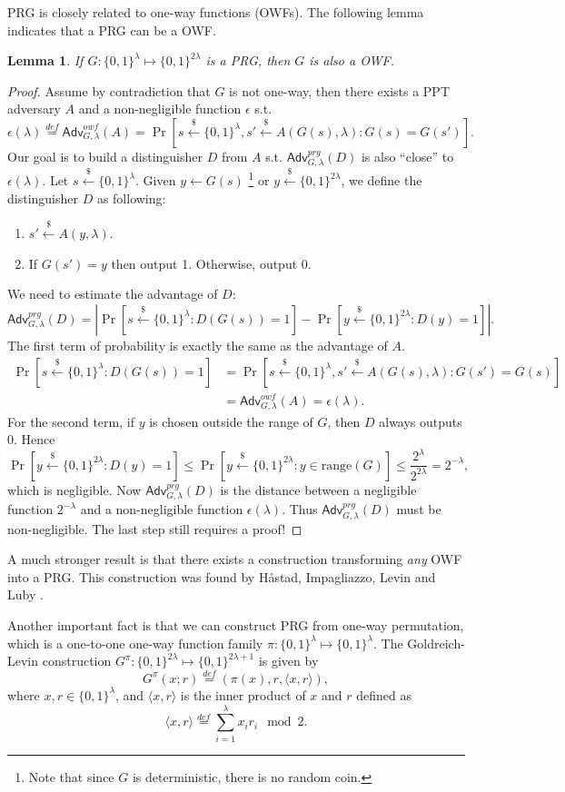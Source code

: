 \documentclass[12pt]{article}
\newcommand{\eqdef}{\stackrel{def}{=}}
\newcommand{\bits}{\{0,1\}}
\newcommand{\getsr}{\stackrel{\$}{\gets}}
\newcommand{\angles}[1]{\langle #1 \rangle}
\newcommand{\Adv}{\textsf{Adv}}
\newtheorem{lemma}[theorem]{Lemma}
\theoremstyle{definition}
\begin{document}
PRG is closely related to one-way functions (OWFs). The following lemma indicates that a PRG can be a OWF.
\begin{lemma}
If $G:\bits^\lambda \mapsto \bits^{2\lambda}$ is a PRG, then $G$ is also a OWF.
\end{lemma}
\begin{proof}
Assume by contradiction that $G$ is not one-way, then there exists a PPT adversary $A$ and a non-negligible function $\epsilon$ s.t.
$$\epsilon(\lambda) \eqdef \Adv_{G,\lambda}^{owf}(A) =\Pr[s\getsr\bits^\lambda, s'\getsr A(G(s),\lambda): G(s)=G(s')].$$
Our goal is to build a distinguisher $D$ from $A$ s.t. $\Adv_{G,\lambda}^{prg}(D)$ is also ``close'' to $\epsilon(\lambda)$.
Let $s\getsr\bits^\lambda$. Given $y\gets G(s)$ \footnote{Note that since $G$ is deterministic, there is no random coin.} or $y\getsr \bits^{2\lambda}$, we define the distinguisher $D$ as following:
\begin{enumerate}
\item $s' \getsr A(y, \lambda)$.
\item If $G(s') = y$ then output 1. Otherwise, output 0.
\end{enumerate}
We need to estimate the advantage of $D$:
$$\Adv_{G,\lambda}^{prg}(D) = \left| \Pr[s\getsr \bits^\lambda : D(G(s))=1] - \Pr[y\getsr\bits^{2\lambda} : D(y)=1] \right|.$$
The first term of probability is exactly the same as the advantage of $A$.
\[
\begin{aligned}
\Pr[s\getsr\bits^\lambda : D(G(s))=1] &= \Pr[s\getsr\bits^\lambda, s'\getsr A(G(s),\lambda): G(s') = G(s)] \\
&= \Adv_{G,\lambda}^{owf}(A) = \epsilon(\lambda).
\end{aligned}
\]
For the second term, if $y$ is chosen outside the range of $G$, then $D$ always outputs 0. Hence
\[
\Pr[y\getsr\bits^{2\lambda} : D(y)=1] \leq \Pr[y\getsr\bits^{2\lambda} : y\in\mathrm{range}(G)] 
\leq \frac{2^\lambda}{2^{2\lambda}} = 2^{-\lambda},
\]
which is negligible. Now $\Adv_{G,\lambda}^{prg}(D)$ is the distance between a negligible function $2^{-\lambda}$ and a non-negligible function $\epsilon(\lambda)$. Thus $\Adv_{G,\lambda}^{prg}(D)$ must be non-negligible. The last step still requires a proof!
\end{proof}

A much stronger result is that there exists a construction transforming \emph{any} OWF into a PRG. This construction was found by H\aa stad, Impagliazzo, Levin and Luby \cite{HILL99}.

Another important fact is that we can construct PRG from one-way permutation, which is a one-to-one one-way function family $\pi: \bits^\lambda \mapsto \bits^\lambda$. The Goldreich-Levin construction \cite{GL89} $G^\pi : \bits^{2\lambda} \mapsto \bits^{2\lambda+1}$ is given by
$$G^\pi(x; r) \eqdef (\pi(x), r, \angles{x,r}),$$
where $x, r\in\bits^\lambda$, and $\angles{x,r}$ is the inner product of $x$ and $r$ defined as
$$\angles{x,r} \eqdef \sum_{i=1}^\lambda x_ir_i \mod 2.$$
\end{document}
